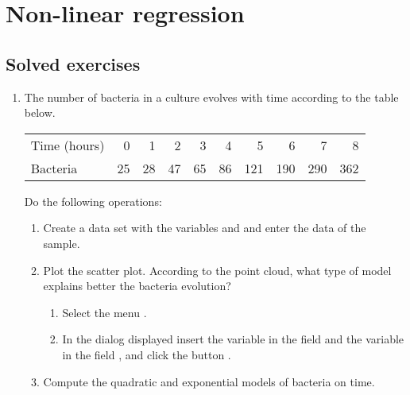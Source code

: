 
\chapter{Non-linear regression}\label{cha:non-linear-regression}

\section{Solved exercises}
\begin{enumerate}[leftmargin=*]
\item The number of bacteria in a culture evolves with time according to the table below.

\begin{center}
\begin{tabular}{lrrrrrrrrr}
\hline
Time (hours) & 0 & 1 & 2 & 3 & 4 & 5 & 6 & 7 & 8  \\
Bacteria & 25 & 28 & 47 & 65 & 86 & 121 & 190 & 290 & 362\\
\hline
\end{tabular}
\end{center}

Do the following operations:
\begin{enumerate}
\item Create a data set with the variables  and  and enter the data of the sample.

\item Plot the scatter plot. 
According to the point cloud, what type of model explains better the bacteria evolution?
\begin{indication}
\begin{enumerate}
\item Select the menu .
\item In the dialog displayed insert the variable  in the field 
and the variable  in the field , and click the button .
\end{enumerate}
\end{indication}

\item Compute the quadratic and exponential models of bacteria on time.


\end{enumerate}
\end{enumerate}
